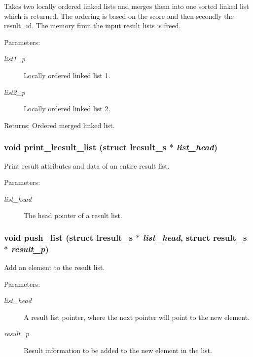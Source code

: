 Takes two locally ordered linked lists and merges them into one sorted linked list which is returned. The ordering is based on the score and then secondly the result\_\-id. The memory from the input result lists is freed.

\begin{Desc}
\item[Parameters:]
\begin{description}
\item[{\em list1\_\-p}]Locally ordered linked list 1. \item[{\em list2\_\-p}]Locally ordered linked list 2. \end{description}
\end{Desc}
\begin{Desc}
\item[Returns:]Ordered merged linked list. \end{Desc}
\subsubsection{\setlength{\rightskip}{0pt plus 5cm}void print\_\-lresult\_\-list (struct \bf{lresult\_\-s} $\ast$ {\em list\_\-head})}\label{llist_8h_4f96c1bf84a36cd8002686a09f73619a}


Print result attributes and data of an entire result list.

\begin{Desc}
\item[Parameters:]
\begin{description}
\item[{\em list\_\-head}]The head pointer of a result list. \end{description}
\end{Desc}
\subsubsection{\setlength{\rightskip}{0pt plus 5cm}void push\_\-list (struct \bf{lresult\_\-s} $\ast$ {\em list\_\-head}, struct \bf{result\_\-s} $\ast$ {\em result\_\-p})}\label{llist_8h_ce355cfa20f1b965435b3307c7a82789}


Add an element to the result list.

\begin{Desc}
\item[Parameters:]
\begin{description}
\item[{\em list\_\-head}]A result list pointer, where the next pointer will point to the new element. \item[{\em result\_\-p}]Result information to be added to the new element in the list. \end{description}
\end{Desc}
